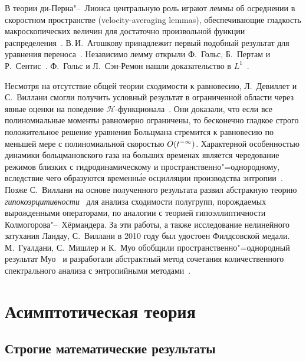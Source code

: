 В теории ди-Перна"--~Лионса центральную роль играют леммы об осреднении в скоростном пространстве (velocity-averaging lemmas),
обеспечивающие гладкость макроскопических величин для достаточно произвольной функции распределения~\cite{Sentis1988}.
В.\,И.~Агошкову принадлежит первый подобный результат для уравнения переноса~\cite{Agoshkov1984}.
Независимо лемму открыли Ф.~Гольс, Б.~Пертам и Р.~Сентис~\cite{Sentis1985}.
Ф.~Гольс и Л.~Сэн-Ремон нашли доказательство в \(L^1\)~\cite{Raymond2002}.

Несмотря на отсутствие общей теории сходимости к равновесию,
Л.~Девиллет и С.~Виллани смогли получить условный результат в ограниченной области
через явные оценки на поведение \(\mathcal{H}\)-функционала~\cite{Villani2005}.
Они доказали, что если все полиномиальные моменты равномерно ограничены,
то бесконечно гладкое строго положительное решение уравнения Больцмана стремится к равновесию
по меньшей мере с полиномиальной скоростью \(O(t^{-\infty})\).
Характерной особенностью динамики больцмановского газа на больших временах является чередование режимов
близких с гидродинамическому и пространственно"=однородному, вследствие чего
образуются временн\'{ы}е осцилляции производства энтропии~\cite{Filbet2006}.
Позже С.~Виллани на основе полученного результата развил абстракную теорию \emph{гипокоэрцитивности}~\cite{Villani2009}
для анализа сходимости полугрупп, порождаемых вырожденными операторами,
по аналогии с теорией гипоэллиптичности Колмогорова"--~Хёрмандера.
За эти работы, а также исследование нелинейного затухания Ландау, С.~Виллани в 2010 году был удостоен Филдсовской медали.
М.~Гуалдани, С.~Мишлер и К.~Муо обобщили пространственно"=однородный результат Муо~\cite{Mouhot2006}
и разработали абстрактный метод сочетания количественного спектрального анализа с энтропийными методами~\cite{Gualdani2013}.

\section{Асимптотическая теория} \label{sect:asymptotic}

\subsection{Строгие математические результаты}

